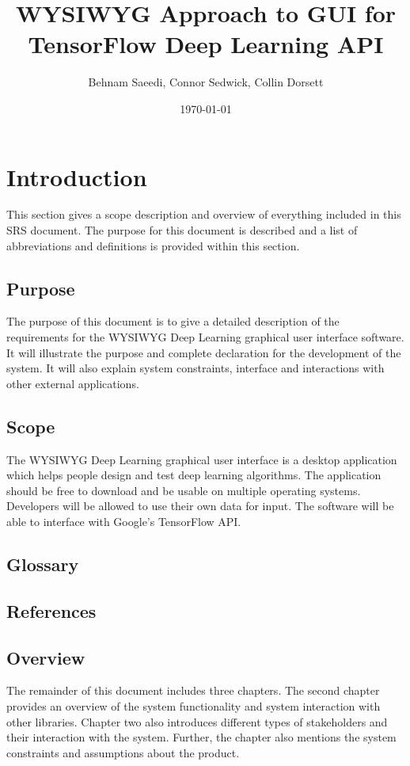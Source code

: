 \documentclass[a4paper,10pt]{article} \usepackage[margin=1.0in]{geometry} \usepackage{pdfpages} \usepackage{graphicx}
\title{WYSIWYG Approach to GUI for TensorFlow Deep Learning API}
\author{Behnam Saeedi, Connor Sedwick, Collin Dorsett}
\date{\today}
\begin{document}
\maketitle
\newpage
\tableofcontents
\newpage
\section{Introduction}

This section gives a scope description and overview of everything included in this SRS document. 
The purpose for this document is described and a list of abbreviations and definitions is provided within this section.

\subsection{Purpose}

The purpose of this document is to give a detailed description of the requirements for the WYSIWYG Deep Learning graphical user interface software. It will illustrate the purpose and complete declaration for the development of the system. It will also explain system constraints, interface and interactions with other external applications. 

\subsection{Scope}

The WYSIWYG Deep Learning graphical user interface is a desktop application which helps people design and test deep learning algorithms.
The application should be free to download and be usable on multiple operating systems.
Developers will be allowed to use their own data for input.
The software will be able to interface with Google's TensorFlow API. 

\subsection{Glossary}
\subsection{References}
\subsection{Overview}

The remainder of this document includes three chapters. 
The second chapter provides an overview of the system functionality and system interaction with other libraries. 
Chapter two also introduces different types of stakeholders and their interaction with the system. 
Further, the chapter also mentions the system constraints and assumptions about the product.
\end{document}
